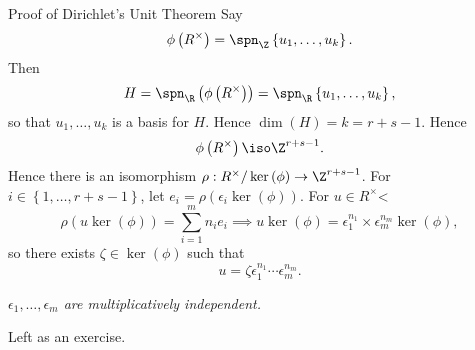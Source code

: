\documentclass[pmath441]{subfiles}
\begin{document}
    \begin{boxyproof}{Proof of Dirichlet's Unit Theorem}
        Say
        \begin{equation*}
            \phi\left( R^{\times} \right) = \spn_{\Z}\left\lbrace u_1,\ldots,u_k \right\rbrace.
        \end{equation*}
        Then
        \begin{equation*}
            H = \spn_{\R}\left( \phi\left( R^{\times} \right) \right) = \spn_{\R}\left\lbrace u_1,\ldots,u_k \right\rbrace,
        \end{equation*}
        so that $u_1,\ldots,u_k$ is a basis for $H$. Hence $\dim\left( H \right) = k = r+s-1$. Hence
        \begin{equation*}
            \phi\left( R^{\times} \right) \iso\Z^{r+s-1}.
        \end{equation*}
        Hence there is an isomorphism $\rho: R^{\times} /\ker\left( \phi \right)\to\Z^{r+s-1}$. For $i\in\left\lbrace 1,\ldots,r+s-1 \right\rbrace$, let $e_i=\rho\left( \epsilon_i\ker\left( \phi \right) \right)$. For $u\in R^\times$<
        \begin{equation*}
            \rho\left( u\ker\left( \phi \right) \right) = \sum^{m}_{i=1} n_ie_i \implies u\ker\left( \phi \right) = \epsilon_1^{n_1}\times\epsilon_m^{n_m}\ker\left( \phi \right),
        \end{equation*}
        so there exists $\zeta\in\ker\left( \phi \right)$ such that
        \begin{equation*}
            u = \zeta\epsilon_1^{n_1}\cdots\epsilon_m^{n_m}.
        \end{equation*}

        \begin{claim}
            \textit{$\epsilon_1,\ldots,\epsilon_m$ are multiplicatively independent.}

            Left as an exercise.
        \end{claim}
    \end{boxyproof}
    
    
    
    
    
    
    
    
    
    
    
    
    
    
    
    
    
    
    
    
    
    
    
    
    
    
    
    
    
    
    
    
    
    
    
    
    
    
    
\end{document}

